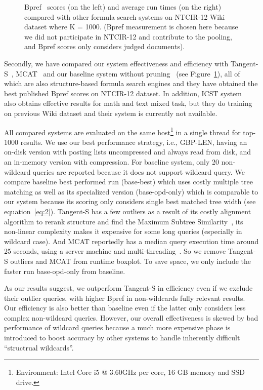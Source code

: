\documentclass[runningheads]{llncs}
\begin{document}
\begin{figure}[!t]
\begin{center}
\caption{Bpref~\cite{buckley2004retrieval} scores (on the left) and average run times (on the right) compared with other formula search systems on NTCIR-12 Wiki dataset where K = 1000.
(Bpref measurement is chosen here because we did not participate in NTCIR-12 and contribute to the pooling, and Bpref scores only considers judged documents).
}
\label{boxplot}
\end{center}

\end{figure}

Secondly, we have compared our system effectiveness and efficiency with Tangent-S~\cite{tangent-combine2017}, MCAT~\cite{mcat_16} and our baseline system without pruning~\cite{a0_2019} (see Figure~\ref{boxplot}), all of which are also structure-based formula search engines and they have obtained the best published Bpref scores on NTCIR-12 dataset.
In addition, ICST system~\cite{peking2016} also obtains effective results for math and text mixed task, but they do training on previous Wiki dataset and their system is currently not available.

All compared systems are evaluated on the same host\footnote{Environment: Intel Core i5 @ 3.60GHz per core, 16 GB memory and SSD drive.} in a single thread for top-1000 results.
%
We use our best performance strategy, i.e., GBP-LEN, having an on-disk version with posting lists uncompressed and always read from disk, and an in-memory version with compression.
%
For baseline system, only 20 non-wildcard queries are reported because it does not support wildcard query.
We compare baseline best performed run (base-best) which uses costly multiple tree matching as well as its specialized version (base-opd-only) which is comparable to our system because its scoring only considers single best matched tree width (see equation~\ref{eq:2}).
%
Tangent-S has a few outliers as a result of its costly alignment algorithm to rerank structure and find the Maximum Subtree Similarity~\cite{tangent-multistage2016}, its non-linear complexity makes it expensive for some long queries (especially in wildcard case).
%
And MCAT reportedly has a median query execution time around 25 seconds, using a server machine and multi-threading~\cite{mcat_16}.
So we remove Tangent-S outliers and MCAT from runtime boxplot.
To save space, we only include the faster run base-opd-only from baseline.

As our results suggest, we outperform Tangent-S in efficiency even if we exclude their outlier queries, with higher Bpref in non-wildcards fully relevant results. Our efficiency is also better than baseline even if the latter only considers less complex non-wildcard queries.
%
However, our overall effectiveness is skewed by bad performance of wildcard queries because a much more expensive phase is introduced to boost accuracy by other systems to handle inherently difficult ``structrual wildcards''.
\end{document}
